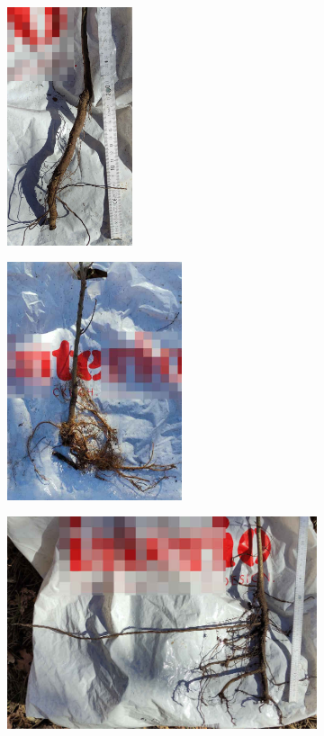\documentclass[twocolumn]{scrartcl}
\begin{document}
\begin{figure}[htbp]
  \centering
  \begin{subfigure}[t]{0.4\linewidth}
    \centering
    \includegraphics[height=7cm]{./bild/wurzelRoteiche}
  \end{subfigure}%
  \begin{subfigure}[t]{0.55\linewidth}
    \centering
    \includegraphics[height=7cm]{./bild/wurzelStieleiche}
  \end{subfigure}
  \begin{subfigure}[t]{0.95\linewidth}
    \centering
    \includegraphics[width=\linewidth]{./bild/wurzelTraubeneiche}

\end{subfigure}
\end{figure}
\end{document}
